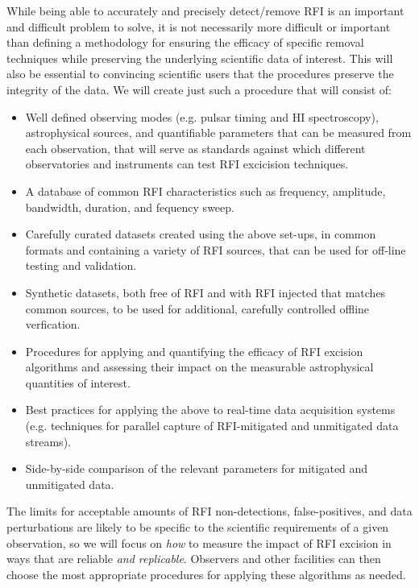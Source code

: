 \documentclass[10pt]{myNSF}
\begin{document}
While being able to accurately and precisely detect/remove RFI is an
important and difficult problem to solve, it is not necessarily more
difficult or important than defining a methodology for ensuring the
efficacy of specific removal techniques while preserving the
underlying scientific data of interest.  This will also be essential
to convincing scientific users that the procedures preserve the
integrity of the data.  We will create just such a procedure that will
consist of:
\begin{itemize}
\item{Well defined observing modes (e.g. pulsar timing and H{\sc I}
  spectroscopy), astrophysical sources, and quantifiable parameters
  that can be measured from each observation, that will serve as
  standards against which different observatories and instruments can
  test RFI excicision techniques.}
\item{A database of common RFI characteristics such as frequency,
  amplitude, bandwidth, duration, and fequency sweep.}
\item{Carefully curated datasets created using the above set-ups, in
  common formats and containing a variety of RFI sources, that can be
  used for off-line testing and validation.}
\item{Synthetic datasets, both free of RFI and with RFI injected that
  matches common sources, to be used for additional, carefully
  controlled offline verfication.}
\item{Procedures for applying and quantifying the efficacy of RFI
  excision algorithms and assessing their impact on the measurable
  astrophysical quantities of interest.}
\item{Best practices for applying the above to real-time data
  acquisition systems (e.g. techniques for parallel capture of
  RFI-mitigated and unmitigated data streams).}
\item{Side-by-side comparison of the relevant parameters for mitigated
  and unmitigated data.}
\end{itemize}

The limits for acceptable amounts of RFI non-detections,
false-positives, and data perturbations are likely to be specific to
the scientific requirements of a given observation, so we will focus
on \emph{how} to measure the impact of RFI excision in ways that are
reliable \emph{and replicable}.  Observers and other facilities can
then choose the most appropriate procedures for applying these
algorithms as needed.
\end{document}
